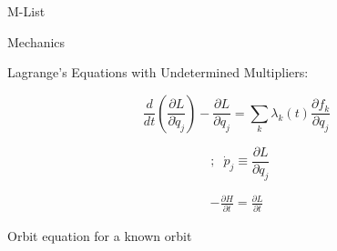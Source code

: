 \documentclass{article}
\begin{document}
M-List


\begin{center}
Mechanics


\end{center}


Lagrange's Equations with Undetermined Multipliers:


\[\frac{d}{dt} \left( \frac{\partial L}{\partial \dot{q} _{j} } \right)
-\frac{\partial L}{\partial q_{j} } =\sum\limits_{k}\lambda _{k} \left(
t\right) \frac{\partial f_{k} }{\partial q_{j} }  
\]


\[ \;\;;\;\;\dot{p}
_{j} \equiv \frac{\partial L}{\partial q_{j} } 
\] \begin{gather*}
 \\
 \\
-\frac{\partial H}{\partial t} =\frac{\partial L}{\partial t} 
\end{gather*}

Orbit equation for a known orbit 
\end{document}

